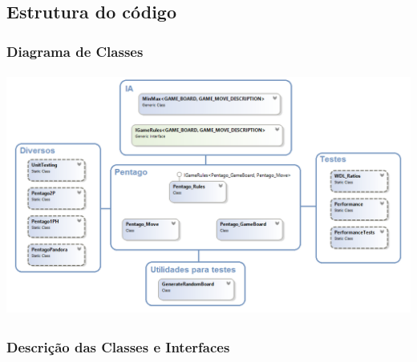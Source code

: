 \subsection{Estrutura do código}

\subsubsection{Diagrama de Classes}

\begin{table}[H]
\centering
\includegraphics[height=8cm]{images/ClassDiagram1.png}
\end{table}

\subsubsection{Descrição das Classes e Interfaces}

